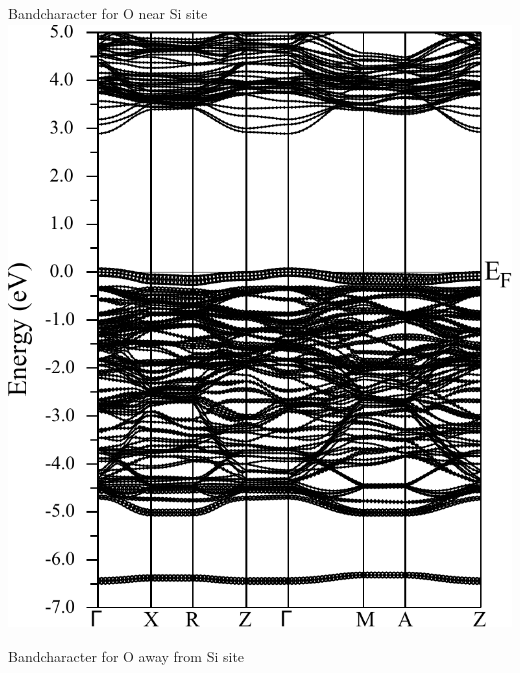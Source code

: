 \documentclass[blues]{poster}
\begin{document}
\begin{multicols}{2}
\vspace{-0.3cm}
\begin{minipage}{0.5\linewidth}
\begin{center}
\hspace{1.3cm}Bandcharacter for O near Si site\vspace{0.1cm}
\includegraphics[height=16cm]{figures/spaghettiOSi.pdf}
\end{center}
\end{minipage}
\begin{minipage}{0.5\linewidth}
\begin{center}
\hspace{0.3cm}Bandcharacter for O away from Si site\vspace{0.1cm}

\end{center}
\end{minipage}
\end{multicols}
\end{document}
